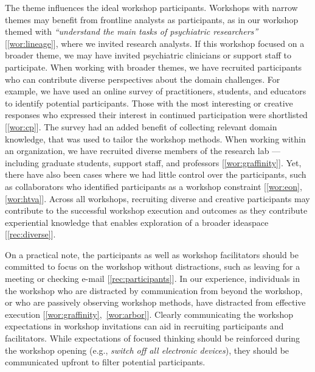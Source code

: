 The theme influences the ideal workshop participants. Workshops with narrow themes may benefit from frontline analysts as participants, as in our workshop themed with \emph{``understand the main tasks of psychiatric researchers''} [\ref{wor:lineage}], where we invited research analysts. If this workshop focused on a broader theme, we may have invited psychiatric clinicians or support staff to participate. When working with broader themes, we have recruited participants who can contribute diverse perspectives about the domain challenges. For example, we have used an online survey of practitioners, students, and educators to identify potential participants. Those with the most interesting or creative responses who expressed their interest in continued participation were shortlisted [\ref{wor:cp}]. The survey had an added benefit of collecting relevant domain knowledge, that was used to tailor the workshop methods. When working within an organization, we have recruited diverse members of the research lab --- including graduate students, support staff, and professors [\ref{wor:graffinity}]. Yet, there have also been cases where we had little control over the participants, such as collaborators who identified participants as a workshop constraint [\ref{wor:eon},\ref{wor:htva}]. Across all workshops, recruiting diverse and creative participants may contribute to the successful workshop execution and outcomes as they contribute experiential knowledge that enables exploration of a broader ideaspace [\ref{rec:diverse}]. 

On a practical note, the participants as well as workshop facilitators should be committed to focus on the workshop without distractions, such as leaving for a meeting or checking e-mail [\ref{rec:participants}]. In our experience, individuals in the workshop who are distracted by communication from beyond the workshop, or who are passively observing workshop methods, have distracted from effective execution [\ref{wor:graffinity},~\ref{wor:arbor}]. Clearly communicating the workshop expectations in workshop invitations can aid in recruiting participants and facilitators. While expectations of focused thinking should be reinforced during the workshop opening (e.g., \emph{switch off all electronic devices}), they should be communicated upfront to filter potential participants.

